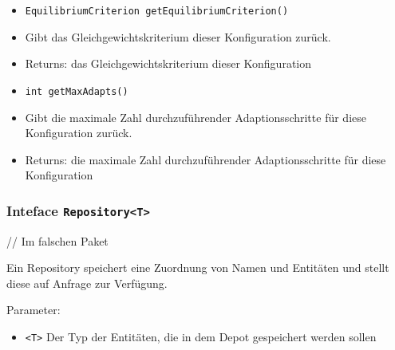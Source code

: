 \documentclass[parskip=full,11pt]{scrartcl}
\begin{document}
\begin{itemize}
\item \texttt{EquilibriumCriterion getEquilibriumCriterion()}
\item[] Gibt das Gleichgewichtskriterium dieser Konfiguration zurück.
\item[] Returns: das Gleichgewichtskriterium dieser Konfiguration

\item \texttt{int getMaxAdapts()}
\item[] Gibt die maximale Zahl durchzuführender Adaptionsschritte für diese Konfiguration zurück.
\item[] Returns: die maximale Zahl durchzuführender Adaptionsschritte für diese Konfiguration
\end{itemize}

\subsubsection{Inteface \texttt{Repository<T>}}

// Im falschen Paket

Ein Repository speichert eine Zuordnung von Namen und Entitäten und stellt diese auf Anfrage zur Verfügung.

Parameter:
\begin{itemize}\itemsep -10pt
	\item \texttt{<T>} Der Typ der Entitäten, die in dem Depot gespeichert werden sollen
\end{itemize}
\end{document}
